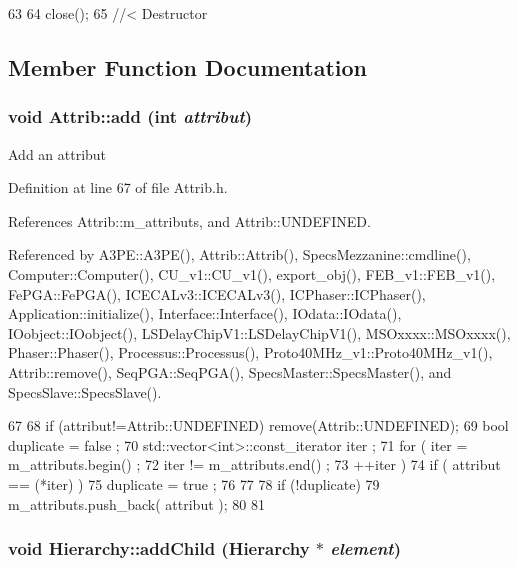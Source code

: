 \begin{DoxyCode}
63                             {
64     close();
65   } //< Destructor
\end{DoxyCode}


\subsection{Member Function Documentation}
\hypertarget{classAttrib_a235f773af19c900264a190b00a3b4ad7}{
\subsubsection[{add}]{\setlength{\rightskip}{0pt plus 5cm}void Attrib::add (int {\em attribut})}}
\label{classAttrib_a235f773af19c900264a190b00a3b4ad7}
Add an attribut 

Definition at line 67 of file Attrib.h.

References Attrib::m\_\-attributs, and Attrib::UNDEFINED.

Referenced by A3PE::A3PE(), Attrib::Attrib(), SpecsMezzanine::cmdline(), Computer::Computer(), CU\_\-v1::CU\_\-v1(), export\_\-obj(), FEB\_\-v1::FEB\_\-v1(), FePGA::FePGA(), ICECALv3::ICECALv3(), ICPhaser::ICPhaser(), Application::initialize(), Interface::Interface(), IOdata::IOdata(), IOobject::IOobject(), LSDelayChipV1::LSDelayChipV1(), MSOxxxx::MSOxxxx(), Phaser::Phaser(), Processus::Processus(), Proto40MHz\_\-v1::Proto40MHz\_\-v1(), Attrib::remove(), SeqPGA::SeqPGA(), SpecsMaster::SpecsMaster(), and SpecsSlave::SpecsSlave().


\begin{DoxyCode}
67                             {
68     if (attribut!=Attrib::UNDEFINED) remove(Attrib::UNDEFINED);
69     bool duplicate = false ;
70     std::vector<int>::const_iterator iter ;
71     for ( iter  = m_attributs.begin() ;
72           iter != m_attributs.end()   ;
73           ++iter ) {
74       if ( attribut == (*iter) ) {
75         duplicate = true ;
76       }
77     }
78     if (!duplicate) {
79       m_attributs.push_back( attribut );
80     }
81   }
\end{DoxyCode}
\hypertarget{classHierarchy_ad677774ff38fcb257c04a3a10d471fac}{
\subsubsection[{addChild}]{\setlength{\rightskip}{0pt plus 5cm}void Hierarchy::addChild ({\bf Hierarchy} $\ast$ {\em element})}}
\label{classHierarchy_ad677774ff38fcb257c04a3a10d471fac}


